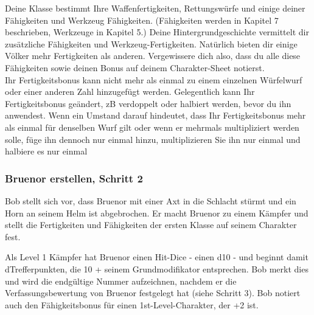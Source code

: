 Deine Klasse bestimmt Ihre Waffenfertigkeiten, Rettungswürfe und einige deiner Fähigkeiten und Werkzeug Fähigkeiten. (Fähigkeiten werden in Kapitel 7 beschrieben, Werkzeuge in Kapitel 5.) Deine Hintergrundgeschichte vermittelt dir zusätzliche Fähigkeiten und Werkzeug-Fertigkeiten. Natürlich bieten dir einige Völker mehr Fertigkeiten als anderen. Vergewissere dich also, dass du alle diese Fähigkeiten sowie deinen  Bonus auf deinem Charakter-Sheet notierst.\\
Ihr Fertigkeitsbonus kann nicht mehr als einmal zu einem einzelnen Würfelwurf oder einer anderen Zahl hinzugefügt werden. Gelegentlich kann Ihr Fertigkeitsbonus geändert, zB verdoppelt oder halbiert werden, bevor du ihn anwendest. Wenn ein Umstand darauf hindeutet, dass Ihr Fertigkeitsbonus mehr als einmal für denselben Wurf gilt oder wenn er mehrmals multipliziert werden solle, füge ihn dennoch nur einmal hinzu, multiplizieren Sie ihn nur einmal und halbiere es nur einmal
\subsubsection{Bruenor erstellen, Schritt 2}
Bob stellt sich vor, dass Bruenor mit einer Axt in die Schlacht stürmt und ein Horn an seinem Helm ist abgebrochen. Er macht Bruenor zu einem Kämpfer und stellt die Fertigkeiten und Fähigkeiten der ersten Klasse auf seinem Charakter fest.

Als Level 1 Kämpfer hat Bruenor einen Hit-Dice - einen d10 - und beginnt damit dTrefferpunkten, die 10 + seinem Grundmodifikator entsprechen. Bob merkt dies und wird die endgültige Nummer aufzeichnen, nachdem er die Verfassungsbewertung von Bruenor festgelegt hat (siehe Schritt 3). Bob notiert auch den Fähigkeitsbonus für einen 1st-Level-Charakter, der +2 ist.

